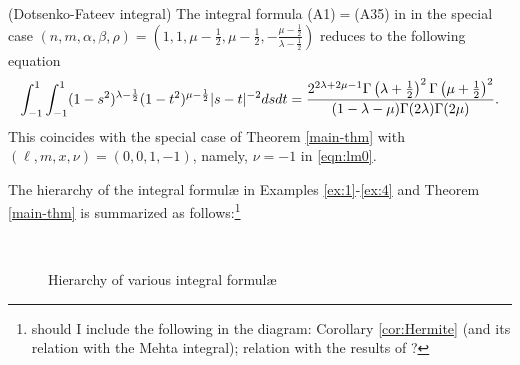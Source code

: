 \documentclass[12pt]{article}
\numberwithin{equation}{section}
\begin{document}
\begin{example}
  \label{ex:4}(Dotsenko-Fateev integral) The integral formula (A1)$=$(A35) in
  {\cite{dotsenko1985four}} in the special case $(n, m, \alpha, \beta, \rho) =
  \left( 1, 1, \mu - \frac{1}{2}, \mu - \frac{1}{2}, - \frac{\mu -
  \frac{1}{2}}{\lambda - \frac{1}{2}} \right)$ reduces to the following
  equation
  \begin{equation}
     \displaystyle\int_{- 1}^1 \displaystyle\displaystyle\int_{- 1}^1 (1 - s^2)^{\lambda
    - \frac{1}{2}} (1 - t^2)^{\mu - \frac{1}{2}} | s - t |^{- 2} d s d t
    = \frac{ 2^{2\lambda+2\mu-1} \Gamma \left( \lambda + \frac{1}{2} \right)^2 \Gamma \left(
    \mu + \frac{1}{2} \right)^2}{(1-\lambda - \mu ) \Gamma (2 \lambda) \Gamma
    (2 \mu)} .
    \label{eqn:spec_df}
  \end{equation}
  This coincides with the special case of Theorem \ref{main-thm} with $(\ell,
  m, x, \nu) = (0, 0, 1, - 1)$, namely, $\nu=-1$ in \eqref{eqn:lm0}.
\end{example}

The hierarchy of the integral formul{\ae} in Examples \ref{ex:1}-\ref{ex:4}
and Theorem \ref{main-thm} is summarized as follows:\footnote{should I include
the following in the diagram: Corollary \ref{cor:Hermite} (and its relation
with the Mehta integral); relation with the results of
{\cite{kobayashi2011schrodinger}}?}

\

\begin{figure}[h]
	\centering
	
\caption{Hierarchy of various integral formul{\ae}\label{table}}
\end{figure}

\end{document}
